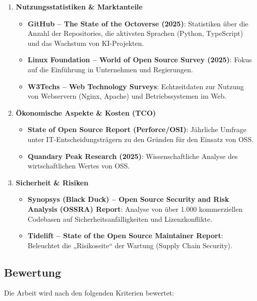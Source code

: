 \documentclass[
  nswissgerman,
  a4paper,
  DIV=11,
  numbers=noendperiod,
  ngerman]{scrreprt}
\providecommand{\tightlist}{%
  \setlength{\itemsep}{0pt}\setlength{\parskip}{0pt}}
\begin{document}
\begin{enumerate}
\def\labelenumi{\arabic{enumi}.}
\item
  \textbf{Nutzungsstatistiken \& Marktanteile}

  \begin{itemize}
  \tightlist
  \item
    \textbf{GitHub -- The State of the Octoverse (2025)}: Statistiken
    über die Anzahl der Repositories, die aktivsten Sprachen (Python,
    TypeScript) und das Wachstum von KI-Projekten.
  \item
    \textbf{Linux Foundation -- World of Open Source Survey (2025)}:
    Fokus auf die Einführung in Unternehmen und Regierungen.
  \item
    \textbf{W3Techs -- Web Technology Surveys}: Echtzeitdaten zur
    Nutzung von Webservern (Nginx, Apache) und Betriebssystemen im Web.
  \end{itemize}
\item
  \textbf{Ökonomische Aspekte \& Kosten (TCO)}

  \begin{itemize}
  \tightlist
  \item
    \textbf{State of Open Source Report (Perforce/OSI)}: Jährliche
    Umfrage unter IT-Entscheidungsträgern zu den Gründen für den Einsatz
    von OSS.
  \item
    \textbf{Quandary Peak Research (2025)}: Wissenschaftliche Analyse
    des wirtschaftlichen Wertes von OSS.
  \end{itemize}
\item
  \textbf{Sicherheit \& Risiken}

  \begin{itemize}
  \tightlist
  \item
    \textbf{Synopsys (Black Duck) -- Open Source Security and Risk
    Analysis (OSSRA) Report}: Analyse von über 1.000 kommerziellen
    Codebasen auf Sicherheitsanfälligkeiten und Lizenzkonflikte.
  \item
    \textbf{Tidelift -- State of the Open Source Maintainer Report}:
    Beleuchtet die „Risikoseite`` der Wartung (Supply Chain Security).
  \end{itemize}
\end{enumerate}

\subsection{Bewertung}\label{bewertung}

Die Arbeit wird nach den folgenden Kriterien bewertet:
\end{document}
